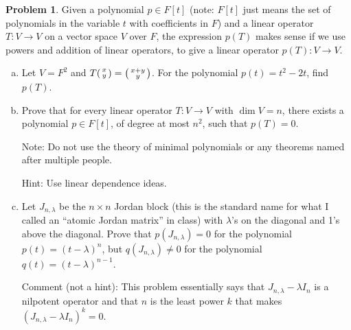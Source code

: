 \documentclass[11pt,oneside]{amsart}
\theoremstyle{definition}
\newtheorem{problem}{Problem}
\newcommand*\colvec[1]{\begin{psmallmatrix}#1\end{psmallmatrix}}
\begin{document}
    \begin{problem}
        Given a polynomial $p\in F[t]$ (note: $F[t]$ just means the set of polynomials in the variable $t$ with coefficients in $F$) and a linear operator $T\colon V\to V$ on a vector space $V$ over $F$, the expression $p(T)$ makes sense if we use powers and addition of linear operators, to give a linear operator $p(T)\colon V\to V$.

        \begin{enumerate}[(a)]
            \item Let $V=F^2$ and $T\colvec{x\\y}=\colvec{x+y\\y}$. For the polynomial $p(t)=t^2-2t$, find $p(T)$.
            \item Prove that for every linear operator $T\colon V\to V$ with $\dim V=n$, there exists a polynomial $p\in F[t]$, of degree at most $n^2$, such that $p(T)=0$.
            
            Note: Do not use the theory of minimal polynomials or any theorems named after multiple people.

            Hint: Use linear dependence ideas.
            \item Let $J_{n,\lambda}$ be the $n\times n$ Jordan block (this is the standard name for what I called an ``atomic Jordan matrix'' in class) with $\lambda$'s on the diagonal and 1's above the diagonal. Prove that $p(J_{n,\lambda})=0$ for the polynomial $p(t)=(t-\lambda)^n$, but $q(J_{n,\lambda})\neq 0$ for the polynomial $q(t)=(t-\lambda)^{n-1}$.
            
            Comment (not a hint): This problem essentially says that $J_{n,\lambda}-\lambda I_n$ is a nilpotent operator and that $n$ is the least power $k$ that makes $(J_{n,\lambda}-\lambda I_n)^k=0$.
        \end{enumerate}
    \end{problem}
    
\end{document}
